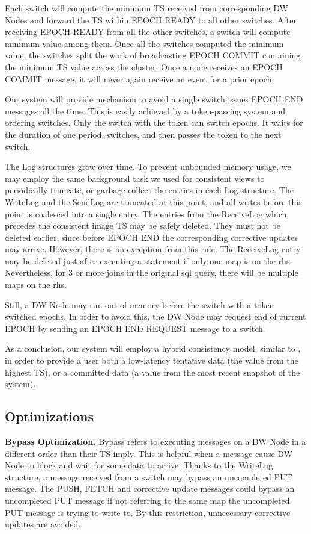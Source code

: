 \documentclass{sig-semester}
\begin{document}
Each switch will compute the minimum TS received from corresponding DW Nodes and forward the TS within EPOCH READY to all other switches. After receiving EPOCH READY from all the other switches, a switch will compute minimum value among them. Once all the switches computed the minimum value, the switches split the work of broadcasting EPOCH COMMIT containing the minimum TS value across the cluster. Once a node receives an EPOCH COMMIT message, it will never again receive an event for a prior epoch.

Our system will provide mechanism to avoid a single switch issues EPOCH END messages all the time. This is easily achieved by a token-passing system and ordering switches. Only the switch with the token can switch epochs. It waits for the duration of one period, switches, and then passes the token to the next switch.

The Log structures grow over time. To prevent unbounded memory usage, we may employ the same background task we used for consistent views to periodically truncate, or garbage collect the entries in each Log structure. The WriteLog and the SendLog are truncated at this point, and all writes before this point is coalesced into a single entry. The entries from the ReceiveLog which precedes the consistent image TS may be safely deleted. They must not be deleted earlier, since before EPOCH END the corresponding corrective updates may arrive. However, there is an exception from this rule. The ReceiveLog entry may be deleted just after executing a statement if only one map is on the rhs. Nevertheless, for 3 or more joins in the original sql query, there will be multiple maps on the rhs.

Still, a DW Node may run out of memory before the switch with a token switched epochs. In order to avoid this, the DW Node may request end of current EPOCH by sending an EPOCH END REQUEST message to a switch.

As a conclusion, our system will employ a hybrid consistency model, similar to \cite{Bayou95}, in order to provide a user both a low-latency tentative data (the value from the highest TS), or a committed data (a value from the most recent snapshot of the system).

\subsection{Optimizations}
\textbf{Bypass Optimization.} Bypass refers to executing messages on a DW Node in a different order than their TS imply. This is helpful when a message cause DW Node to block and wait for some data to arrive. Thanks to the WriteLog structure, a message received from a switch may bypass an uncompleted PUT message. The PUSH, FETCH and corrective update messages could bypass an uncompleted PUT message if not referring to the same map the uncompleted PUT message is trying to write to. By this restriction, unnecessary corrective updates are avoided.
\end{document}
